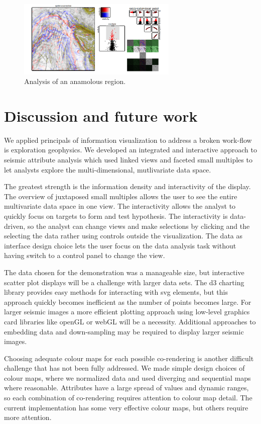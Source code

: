 \documentclass[journal]{vgtc}                %
\begin{document}
\begin{figure}[htb]
\centering
\includegraphics[width=3in]{full_view}
\caption{Analysis of an anamolous region.}
\end{figure}


\section{Discussion and future work}
We applied principals of information visualization to address a broken
work-flow is exploration geophysics. We developed an integrated and interactive
approach to seismic attribute analysis which used linked views and faceted small
multiples to let analysts explore the multi-dimensional, mutlivariate data space.

The greatest strength is the information density and interactivity of the display. The overview 
of juxtaposed small multiples allows the user to see the entire multivariate data space
in one view. The interactivity allows the analyst to quickly focus on targets to form and
test hypothesis. The interactivity is data-driven, so the analyst can change views and make
selections by clicking and the selecting the data rather using controls outside the visualization. 
The data as interface design choice lets the user focus on the data analysis task without having switch
to a control panel to change the view.

The data chosen for the demonstration was a manageable size, but interactive scatter plot
displays will be a challenge with larger data sets. The d3 charting library provides easy methods for
interacting with svg elements, but this approach quickly becomes inefficient as the number of
points becomes large. For larger seismic images a more efficient plotting approach using low-level
graphics card libraries like openGL or webGL will be a necessity. Additional approaches to embedding
data and down-sampling may be required to display larger seismic images.

Choosing adequate colour maps for each possible co-rendering is another difficult challenge
that has not been fully addressed. We made simple design choices of colour maps, where we normalized
data and used diverging and sequential maps where reasonable. Attributes have a large spread of
values and dynamic ranges, so each combination of co-rendering requires attention to colour map detail.
The current implementation has some very effective colour maps, but others require more attention.
\end{document}
